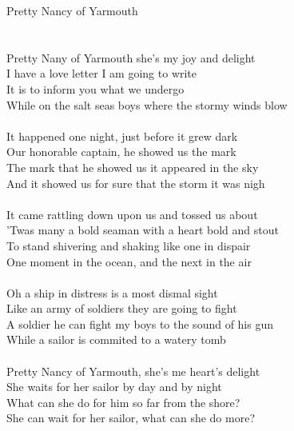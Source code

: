 \documentclass[letterpaper,9pt]{article}
\begin{document}
\newpage
{}
\huge
Pretty Nancy of Yarmouth\\
\\
\LARGE
\\Pretty Nany of Yarmouth she's my joy and delight
\\I have a love letter I am going to write
\\It is to inform you what we undergo
\\While on the salt seas boys where the stormy winds blow
\\
\\It happened one night, just before it grew dark
\\Our honorable captain, he showed us the mark
\\The mark that he showed us it appeared in the sky
\\And it showed us for sure that the storm it was nigh
\\
\\It came rattling down upon us and tossed us about
\\'Twas many a bold seaman with a heart bold and stout
\\To stand shivering and shaking like one in dispair
\\One moment in the ocean, and the next in the air
\\
\\Oh a ship in distress is a most dismal sight
\\Like an army of soldiers they are going to fight
\\A soldier he can fight my boys to the sound of his gun
\\While a sailor is commited to a watery tomb
\\
\\Pretty Nancy of Yarmouth, she's me heart's delight
\\She waits for her sailor by day and by night
\\What can she do for him so far from the shore?
\\She can wait for her sailor, what can she do more?
\end{document}
